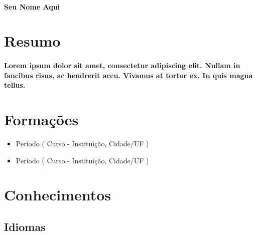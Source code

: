 \documentclass[a4paper,12pt]{memoir} %
\begin{document}

\userinformation 	%

\framebreak 			%

\hfill \\   			%



\textbf{\Large {Seu Nome Aqui}}

\section*{Resumo}

\paragraph
{
	Lorem ipsum dolor sit amet, consectetur adipiscing elit. Nullam in faucibus risus, ac hendrerit arcu. Vivamus at tortor ex. In quis magna tellus.
}



\section*{Formações}

\begin{itemize}
	\item Período ( Curso - Instituição, Cidade/UF )
	\item Período ( Curso - Instituição, Cidade/UF )
\end{itemize}



\section*{Conhecimentos}

\subsection*{Idiomas}
\end{document}
